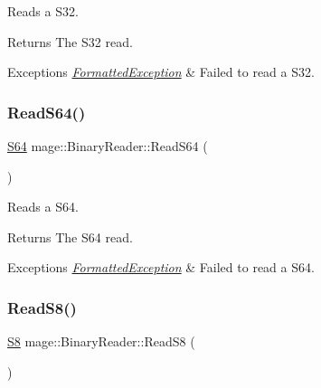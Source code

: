Reads a {\ttfamily S32}.

\begin{DoxyReturn}{Returns}
The {\ttfamily S32} read. 
\end{DoxyReturn}

\begin{DoxyExceptions}{Exceptions}
{\em \hyperlink{classmage_1_1_formatted_exception}{Formatted\+Exception}} & Failed to read a {\ttfamily S32}. \\
\hline
\end{DoxyExceptions}
\hypertarget{classmage_1_1_binary_reader_a287d4d14b7990e1b88f9b913a39d09df}{}\label{classmage_1_1_binary_reader_a287d4d14b7990e1b88f9b913a39d09df} 
\subsubsection{\texorpdfstring{Read\+S64()}{ReadS64()}}
{\footnotesize\ttfamily \hyperlink{namespacemage_a38d4d411c173c8978eb356d2412b32dd}{S64} mage\+::\+Binary\+Reader\+::\+Read\+S64 (\begin{DoxyParamCaption}{ }\end{DoxyParamCaption})\hspace{0.3cm}{\ttfamily [protected]}}

Reads a {\ttfamily S64}.

\begin{DoxyReturn}{Returns}
The {\ttfamily S64} read. 
\end{DoxyReturn}

\begin{DoxyExceptions}{Exceptions}
{\em \hyperlink{classmage_1_1_formatted_exception}{Formatted\+Exception}} & Failed to read a {\ttfamily S64}. \\
\hline
\end{DoxyExceptions}
\hypertarget{classmage_1_1_binary_reader_af1628266b77efcb4e55589af90b522da}{}\label{classmage_1_1_binary_reader_af1628266b77efcb4e55589af90b522da} 
\subsubsection{\texorpdfstring{Read\+S8()}{ReadS8()}}
{\footnotesize\ttfamily \hyperlink{namespacemage_a20766a773cfd6c14d8f2344d4631b89c}{S8} mage\+::\+Binary\+Reader\+::\+Read\+S8 (\begin{DoxyParamCaption}{ }\end{DoxyParamCaption})\hspace{0.3cm}{\ttfamily [protected]}}

